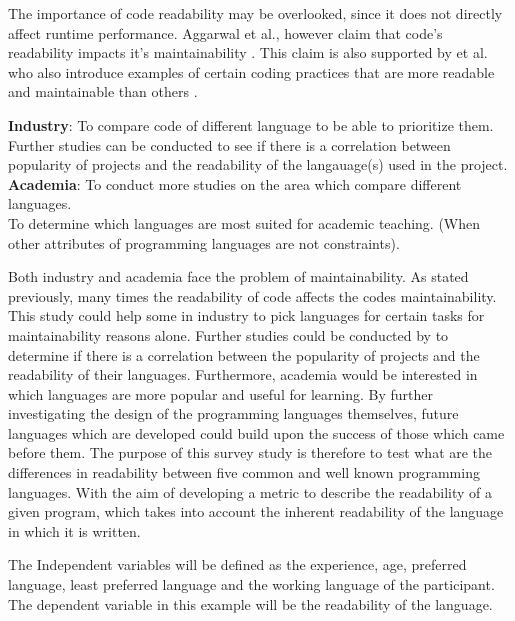 \documentclass[times, 10pt,twocolumn]{IEEEtran}
\begin{document}
The importance of code readability may be overlooked, since it does not directly affect runtime performance. Aggarwal et al., however claim that code's readability impacts it's maintainability \cite{aggarwal2002integrated}. This claim is also supported by \cite{elshoff1982improving} et al. who also introduce examples of certain coding practices that are more readable and maintainable than others \cite{elshoff1982improving}.
\newline

\textbf{Industry}: To compare code of different language to be able to prioritize them. \\
Further studies can be conducted to see if there is a correlation between popularity of projects and the readability of the langauage(s) used in the project. \\
\textbf{Academia}: To conduct more studies on the area which compare different languages. \\
To determine which languages are most suited for academic teaching. (When other attributes of programming languages are not constraints).




Both industry and academia face the problem of maintainability. As stated previously, many times the readability of code affects the codes maintainability. This study could help some in industry to pick languages for certain tasks for maintainability reasons alone. Further studies could be conducted by to determine if there is a correlation between the popularity of projects and the readability of their languages. Furthermore, academia would be interested in which languages are more popular and useful for learning. By further investigating the design of the programming languages themselves, future languages which are developed could build upon the success of those which came before them.
\newline
The purpose of this survey study is therefore to test what are the differences in readability between five common and well known programming languages. With the aim of developing a metric to describe the readability of a given program, which takes into account the inherent readability of the language in which it is written.
\newline

The Independent variables will be defined as the experience, age, preferred language, least preferred language and the working language of the participant. The dependent variable in this example will be the readability of the language.
\newline
\end{document}
